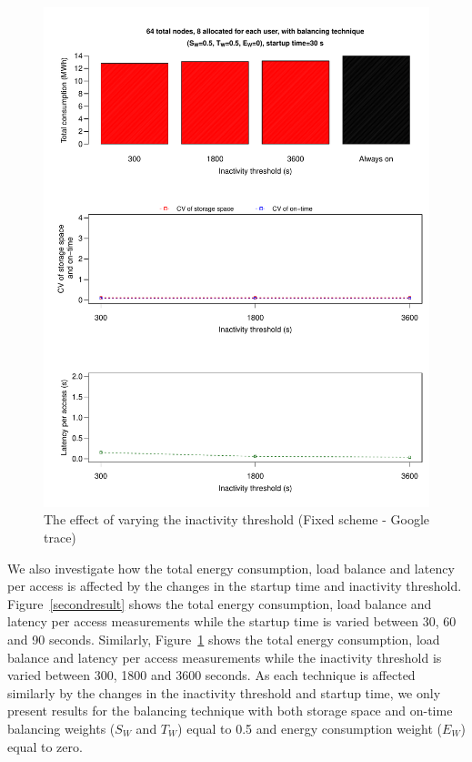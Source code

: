 \begin{figure}[!htbp]
\centering
\includegraphics[width=\columnwidth,keepaspectratio]{FIG8.pdf}
\caption{The effect of varying the inactivity threshold (Fixed scheme - Google trace)}
\label{thirdresult}
\end{figure}

We also investigate how the total energy consumption, load balance and latency per access is affected by the changes in
the startup time and inactivity threshold. Figure~\ref{secondresult} shows the total energy consumption,
load balance and latency per access measurements while the startup time is varied between 30, 60 and 90 seconds. Similarly,
Figure~\ref{thirdresult} shows the total energy consumption, load balance and latency per access measurements while the
inactivity threshold is varied between 300, 1800 and 3600 seconds. As each technique is affected similarly by the changes
in the inactivity threshold and startup time, we only present results for the balancing technique with both storage space
and on-time balancing weights ($S_W$ and $T_W$) equal to 0.5 and energy consumption weight ($E_W$) equal to zero.


